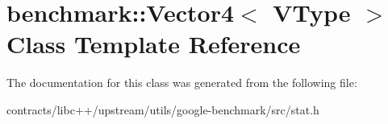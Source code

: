 \hypertarget{classbenchmark_1_1_vector4}{}\section{benchmark\+:\+:Vector4$<$ V\+Type $>$ Class Template Reference}
\label{classbenchmark_1_1_vector4}


The documentation for this class was generated from the following file\+:\begin{DoxyCompactItemize}
\item 
contracts/libc++/upstream/utils/google-\/benchmark/src/stat.\+h\end{DoxyCompactItemize}
